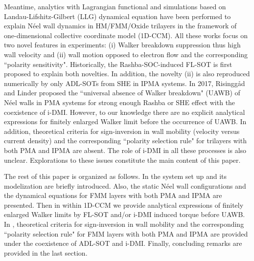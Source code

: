 \documentclass[12pt]{iopart}
\begin{document}
Meantime, analytics with
Lagrangian functional\cite{Linder_PRB_2013b,Tatara_PRB_2008,He_JAP_2013}
and simulations\cite{Martinez_JAP_2012,Martinez_ACMP_2012,Seo_JMMM_2012,Seo_APL_2012,Cros_PRB_2013,Martinez_APL_2013,Martinez_JAP_2014}
based on Landau-Lifshitz-Gilbert (LLG) dynamical equation\cite{LLG_equation}
have been performed to explain N\'{e}el wall dynamics in HM/FMM/Oxide trilayers
in the framework of one-dimensional collective coordinate model (1D-CCM).
All these works focus on two novel features in experiments:
(i) Walker breakdown suppression thus high wall velocity and (ii) wall motion opposed to electron flow
and the corresponding ``polarity sensitivity".
Historically, the Rashba-SOC-induced FL-SOT is first proposed to explain both novelties\cite{Martinez_JAP_2012,Martinez_ACMP_2012,Seo_JMMM_2012}.
In addition, the novelty (ii) is also reproduced numerically by only ADL-SOTs from SHE in IPMA systems\cite{Seo_APL_2012}.
In 2017, Risingg{\aa}d and Linder proposed the ``universal absence of Walker breakdown" (UAWB)
of N\'{e}el walls in PMA systems for strong enough
Rashba or SHE effect\cite{Risinggad_PRB_2017} with the coexistence of i-DMI.
However, to our knowledge there are no explicit analytical expressions for finitely enlarged Walker limit
before the occurrence of UAWB.
In addition, theoretical criteria for sign-inversion in wall mobility (velocity versus current density) 
and the corresponding ``polarity selection rule"
for trilayers with both PMA and IPMA are absent.
The role of i-DMI in all these processes is also unclear.
Explorations to these issues constitute the main content of this paper.

The rest of this paper is organized as follows.
In  the system set up and its modelization are briefly introduced. 
Also, the static N\'{e}el wall configurations and the dynamical equations for 
FMM layers with both PMA and IPMA are presented.
Then in  within 1D-CCM we provide analytical expressions
of finitely enlarged Walker limits by FL-SOT and/or i-DMI induced torque before UAWB.
In , theoretical criteria for sign-inversion in wall mobility and 
the corresponding ``polarity selection rule"
for FMM layers with both PMA and IPMA are provided under the coexistence of ADL-SOT and i-DMI.
Finally, concluding remarks are provided in the last section.
\end{document}
